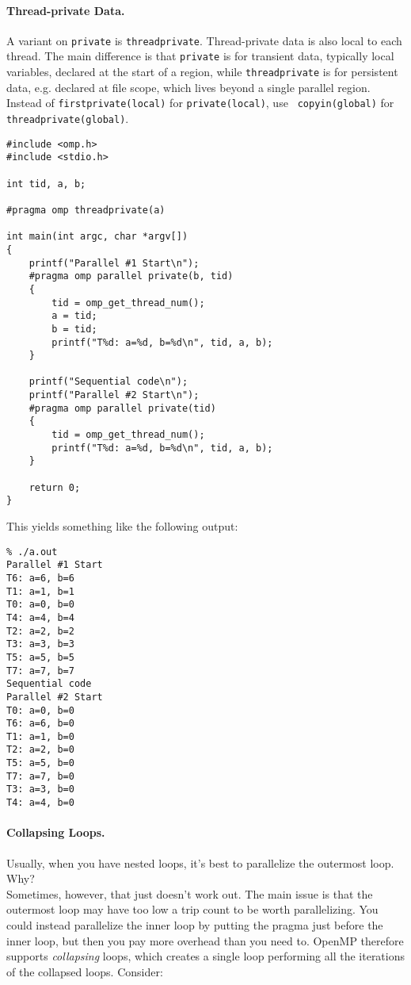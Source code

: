 \documentclass[11pt]{article}
\begin{document}
\paragraph{Thread-private Data.} A variant on {\tt private} is
{\tt threadprivate}. Thread-private data is also local to each
thread. The main difference is that {\tt private} is for transient
data, typically local variables, declared at the start of a region,
while {\tt threadprivate} is for persistent data, e.g. declared at
file scope, which lives beyond a single parallel region. Instead of
{\tt firstprivate(local)} for {\tt private(local)}, use {\tt
  copyin(global)} for {\tt threadprivate(global)}.

\begin{lstlisting}
#include <omp.h>
#include <stdio.h>

int tid, a, b;

#pragma omp threadprivate(a)

int main(int argc, char *argv[])
{
    printf("Parallel #1 Start\n");
    #pragma omp parallel private(b, tid)
    {
        tid = omp_get_thread_num();
        a = tid;
        b = tid;
        printf("T%d: a=%d, b=%d\n", tid, a, b);
    }

    printf("Sequential code\n");
    printf("Parallel #2 Start\n");
    #pragma omp parallel private(tid)
    {
        tid = omp_get_thread_num();
        printf("T%d: a=%d, b=%d\n", tid, a, b);
    }

    return 0;
}    
  \end{lstlisting}
This yields something like the following output:
\begin{lstlisting}
% ./a.out
Parallel #1 Start
T6: a=6, b=6
T1: a=1, b=1
T0: a=0, b=0
T4: a=4, b=4
T2: a=2, b=2
T3: a=3, b=3
T5: a=5, b=5
T7: a=7, b=7
Sequential code
Parallel #2 Start
T0: a=0, b=0
T6: a=6, b=0
T1: a=1, b=0
T2: a=2, b=0
T5: a=5, b=0
T7: a=7, b=0
T3: a=3, b=0
T4: a=4, b=0
\end{lstlisting}

\paragraph{Collapsing Loops.}
Usually, when you have nested loops, it's best to parallelize the
outermost loop. {\sf Why?} \\[2em]

Sometimes, however, that just doesn't work out. The main issue is that
the outermost loop may have too low a trip count to be worth
parallelizing. You could instead parallelize the inner loop by putting
the pragma just before the inner loop, but then you pay more overhead
than you need to. OpenMP therefore supports \emph{collapsing} loops,
which creates a single loop performing all the iterations of the
collapsed loops. Consider:
\end{document}
